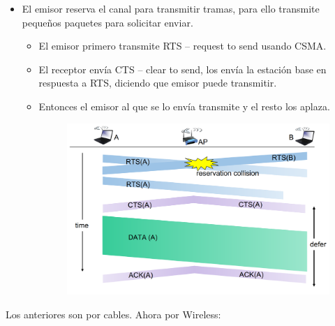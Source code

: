 \documentclass[12pt, twoside, openright]{report} %
\begin{document}
          \begin{itemize}
          \item
            El emisor reserva el canal para transmitir tramas, para ello
            transmite pequeños paquetes para solicitar enviar.

            \begin{itemize}
              \item
              El emisor primero transmite RTS -- request to send usando
              CSMA.
            \item
              El receptor envía CTS -- clear to send, los envía la
              estación base en respuesta a RTS, diciendo que emisor
              puede transmitir.
            \item
              Entonces el emisor al que se lo envía transmite y el resto
              los aplaza.
              \begin{figure}[H]
                {\includegraphics[scale=.25]{Untitled 53.png}}
              \end{figure}
            \end{itemize}
          \end{itemize}

          Los anteriores son por cables. Ahora por Wireless:
\end{document}
